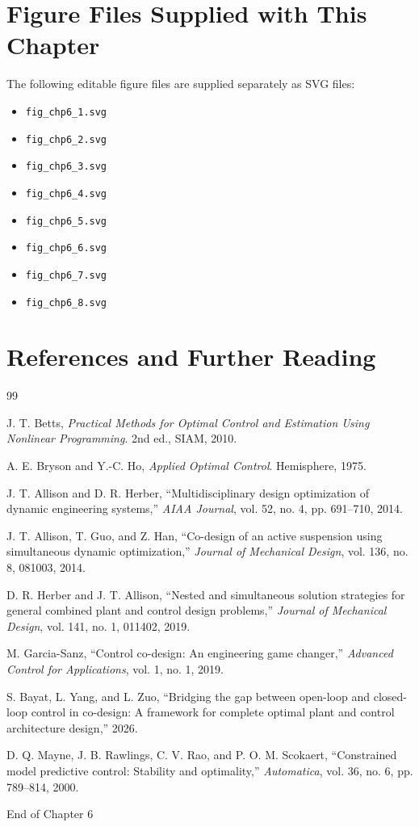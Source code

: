 \documentclass[11pt]{article}
\begin{document}
\section{Figure Files Supplied with This Chapter}

The following editable figure files are supplied separately as SVG files:
\begin{itemize}[leftmargin=1.4em]
  \item \texttt{fig\_chp6\_1.svg}
  \item \texttt{fig\_chp6\_2.svg}
  \item \texttt{fig\_chp6\_3.svg}
  \item \texttt{fig\_chp6\_4.svg}
  \item \texttt{fig\_chp6\_5.svg}
  \item \texttt{fig\_chp6\_6.svg}
  \item \texttt{fig\_chp6\_7.svg}
  \item \texttt{fig\_chp6\_8.svg}
\end{itemize}

\section{References and Further Reading}

\begin{thebibliography}{99}

J. T. Betts, \emph{Practical Methods for Optimal Control and Estimation Using Nonlinear Programming}. 2nd ed., SIAM, 2010.

A. E. Bryson and Y.-C. Ho, \emph{Applied Optimal Control}. Hemisphere, 1975.

J. T. Allison and D. R. Herber, ``Multidisciplinary design optimization of dynamic engineering systems,'' \emph{AIAA Journal}, vol. 52, no. 4, pp. 691--710, 2014.

J. T. Allison, T. Guo, and Z. Han, ``Co-design of an active suspension using simultaneous dynamic optimization,'' \emph{Journal of Mechanical Design}, vol. 136, no. 8, 081003, 2014.

D. R. Herber and J. T. Allison, ``Nested and simultaneous solution strategies for general combined plant and control design problems,'' \emph{Journal of Mechanical Design}, vol. 141, no. 1, 011402, 2019.

M. Garcia-Sanz, ``Control co-design: An engineering game changer,'' \emph{Advanced Control for Applications}, vol. 1, no. 1, 2019.

S. Bayat, L. Yang, and L. Zuo, ``Bridging the gap between open-loop and closed-loop control in co-design: A framework for complete optimal plant and control architecture design,'' 2026.

D. Q. Mayne, J. B. Rawlings, C. V. Rao, and P. O. M. Scokaert, ``Constrained model predictive control: Stability and optimality,'' \emph{Automatica}, vol. 36, no. 6, pp. 789--814, 2000.

\end{thebibliography}

\vfill
\begin{center}
\small\color{CCDgray}
End of Chapter 6
\end{center}
\end{document}

